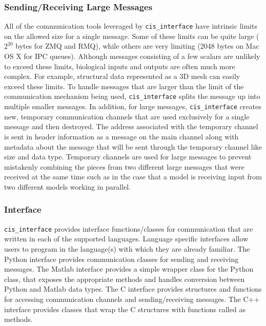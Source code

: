 \documentclass[journal]{IEEEtran}
\newcommand{\cis}{{\tt cis\_interface}{}}
\begin{document}
\subsubsection{Sending/Receiving Large Messages}\label{SSS:large}
%
All of the communication tools leveraged by {\cis} have intrinsic limits 
on the allowed size for a single message. Some of these limits can be quite large 
($2^{20}$ bytes for ZMQ and RMQ), while others are very limiting 
(2048 bytes on Mac OS X for IPC queues). Although messages consisting of a few scalars are unlikely to 
exceed these limits, biological inputs and outputs are often much more complex. 
For example, structural data represented as a 3D mesh can easily exceed these 
limits. To handle messages that are larger than the limit of the communication 
mechanism being used, {\cis} splits the message up into multiple smaller 
messages. In addition, for large messages, {\cis} creates new, temporary 
communication channels that are used exclusively for a single message and 
then destroyed. The address associated with the temporary channel is sent in 
header information as a message on the main channel along with metadata about 
the message that will be sent through the temporary channel like size and data type. 
Temporary channels are used for large messages to prevent mistakenly combining 
the pieces from two different large messages that were received at the same time 
such as in the case that a model is receiving input from two different models 
working in parallel.

\subsubsection{Interface}\label{SSS:interface}
%
{\cis} provides interface functions/classes for communication that are 
written in each of the supported languages. Language specific interfaces 
allow users to program in the 
language(s) with which they are already familiar. The Python interface provides 
communication classes for sending and receiving messages. The Matlab 
interface provides a simple wrapper class for the Python class, that exposes 
the appropriate methods and handles conversion between Python and Matlab 
data types. The C interface provides structures and functions for accessing 
communication channels and sending/receiving messages. The C++ interface 
provides classes that wrap the C structures with functions called as methods.
\end{document}
